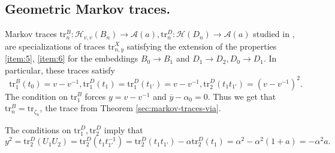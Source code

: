 \documentclass[11pt,leqno]{article}
\theoremstyle{definition}
\theoremstyle{definition}
\theoremstyle{remark}
\newcommand{\He}{\mathcal{H}}
\newcommand{\tr}{\mathrm{tr}}
\begin{document}
\subsection{Geometric Markov traces.}
\label{sec:geom-mark-trac}
Markov traces $\tr_n^B:\He_{v,v}(B_n) \to \mathcal{A}(a), \tr_n^D:\He(D_n) \to \mathcal{A}(a)$ studied in \cite{gomi2006markov}, \cite{websterGeometryMarkovTraces2009} are specializations of traces $\tr_{n,y}^X$ satisfying the extension of the properties \ref{item:5}, \ref{item:6} for the embeddings $B_0 \to B_1$ and $D_1 \to D_2, D_0 \to D_1$. In particular, these traces satisfy
\[
  \tr_1^B(t_0) = v-v^{-1}, \tr_1^D(t_1) = \tr_1^D(t_{1'}) = v-v^{-1}, \tr^D_2(t_1t_{1'}) = (v-v^{-1})^2.
\]
The condition on $\tr_1^B$ forces $y = v - v^{-1}$ and $\overline{y}-\alpha_0 = 0$. Thus we get that $\tr_n^B = \tr_{\zeta_n}$, the trace from Theorem \ref{sec:markov-traces-via}.

The conditions on $\tr_1^D, \tr_2^D$ imply that
\[
  y^2 = \tr_2^D(U_1U_2) = \tr_2^D(t_1t_{1'}^{-1}) = \tr_2^D(t_1t_{1'}) - \alpha \tr_2^D(t_1) = \alpha^2 - \alpha^2(1+a) = -\alpha^2a.
\]
\end{document}
